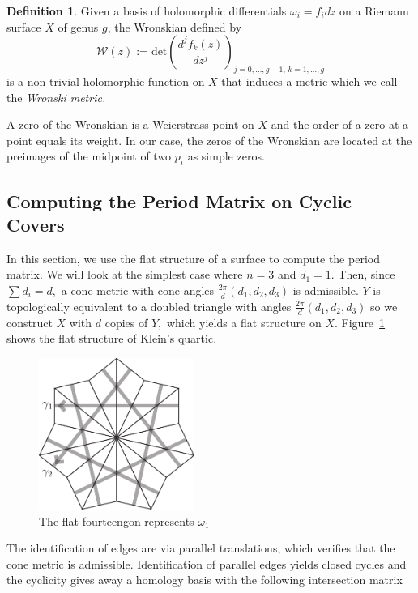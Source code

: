 \documentclass[12pt,reqno]{amsart}
\theoremstyle{definition}
\newtheorem{defn}{Definition}
\theoremstyle{remark}
\begin{document}
\begin{defn}\label{def: wronski} Given a basis of holomorphic differentials $\omega_i = f_i d z$ on a Riemann surface $X$ of genus $g$, the Wronskian defined by $$\mathcal{W}(z) := \textrm{det} \left( \frac{d^j f_k(z)}{d z^j} \right)_{j = 0, \ldots , g - 1, \, k = 1, \ldots , g}$$ is a non-trivial holomorphic function on $X$ that induces a metric which we call the \textit{Wronski metric.} \end{defn}

A zero of the Wronskian is a Weierstrass point on $X$ and the order of a zero at a point equals its weight. In our case, the zeros of the Wronskian are located at the preimages of the midpoint of two $p_i$ as simple zeros.

\subsection{Computing the Period Matrix on Cyclic Covers}
\label{sec:cyclicperiod}
In this section, we use the flat structure of a surface to compute the period matrix. We will look at the simplest case where $n = 3$ and $d_1 = 1.$ Then, since $\sum d_i = d,$ a cone metric with cone angles $\frac{2 \pi}{d}(d_1, d_2, d_3)$ is admissible. $Y$ is topologically equivalent to a doubled triangle with angles $\frac{2 \pi}{d}(d_1, d_2, d_3)$ so we construct $X$ with $d$ copies of $Y,$ which yields a flat structure on $X.$ Figure~\ref{fig: 124_flat} shows the flat structure of Klein's quartic.  

\begin{figure}[htbp] %
   \centering
   \includegraphics[width=2in]{figures/124_flat} 
	\caption{The flat fourteengon represents $\omega_1$}
	\label{fig: 124_flat}
\end{figure}

The identification of edges are via parallel translations, which verifies that the cone metric is admissible. Identification of parallel edges yields closed cycles and the cyclicity gives away a homology basis with the following intersection matrix
\end{document}
